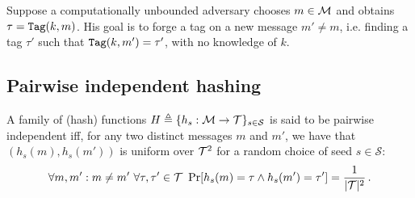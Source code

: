 Suppose a computationally unbounded adversary chooses $m \in \mathcal{M}$ and obtains $\tau = \texttt{Tag}(k, m)$.
His goal is to forge a tag on a new message $m' \neq m$, i.e. finding a tag $\tau'$ such that $\texttt{Tag}(k,m') = \tau'$, with no knowledge of $k$.


\subsection{Pairwise independent hashing}
\begin{definition}
    A family of (hash) functions $H \triangleq \{h_s:\mathcal{M} \to \mathcal{T}\}_{s \in \mathcal{S}}$ is said to be pairwise independent iff, for any two distinct messages $m$ and $m'$, we have that $(h_s(m), h_s(m'))$ is uniform over $\mathcal{T}^2$ for a random choice of seed $s \in \mathcal{S}$:
    \[
        \forall m, m' : m \neq m' \ \forall \tau, \tau' \in \mathcal{T} \ \Pr[h_s(m) = \tau \wedge h_s(m') = \tau'] = \frac{1}{|\mathcal{T}|^2} \, .
    \]
\end{definition}



